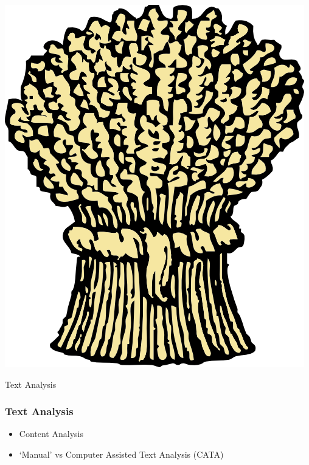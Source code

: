 \documentclass[20pt]{beamer}
\begin{document}
\begin{frame}
  \frametitle{}
  \begin{center}
    \href{http://www.clker.com/cliparts/5/9/3/4/11954357622059403819sheaf_john_olsen_01.svg.hi.png}{\includegraphics[scale=1]{sheaf.png}}
        \end{center}
\end{frame}



\begin{frame}
  \huge{	
  \begin{center}
	{\color{DG} Text Analysis}
  \end{center}
  }
\end{frame}


\begin{frame}
	\frametitle{Text Analysis}
	\begin{itemize}
		\item 	Content Analysis
		\item 	`Manual' vs Computer Assisted Text Analysis (CATA)
	\end{itemize}
\end{frame}
\end{document}
